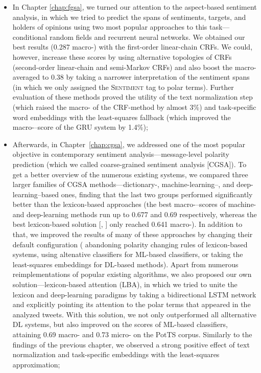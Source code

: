 \begin{itemize}
\item In Chapter \ref{chap:fgsa}, we turned our attention to the
  aspect-based sentiment analysis, in which we tried to predict the
  spans of sentiments, targets, and holders of opinions using two most
  popular approaches to this task---conditional random fields and
  recurrent neural networks.  We obtained our best results (0.287
  macro-\F{}) with the first-order linear-chain CRFs.  We could,
  however, increase these scores by using alternative topologies of
  CRFs (second-order linear-chain and semi-Markov CRFs) and also boost
  the macro-averaged \F{} to 0.38 by taking a narrower interpretation
  of the sentiment spans (in which we only assigned the
  \textsc{Sentiment} tag to polar terms).  Further evaluation of these
  methods proved the utility of the text normalization step (which
  raised the macro-\F{} of the CRF-method by almost 3\%) and
  task-specific word embeddings with the least-squares fallback (which
  improved the macro-\F{}--score of the GRU system by 1.4\%);

\item Afterwards, in Chapter~\ref{chap:cgsa}, we addressed one of the
  most popular objective in contemporary sentiment
  analysis---message-level polarity prediction (which we called
  coarse-grained sentiment analysis [CGSA]).  To get a better overview
  of the numerous existing systems, we compared three larger families
  of CGSA methods---dictionary-, machine-learning--, and
  deep-learning--based ones, finding that the last two groups
  performed significantly better than the lexicon-based approaches
  (the best macro-\F{}--scores of machine- and deep-learning methods
  run up to 0.677 and 0.69 respectively, whereas the best
  lexicon-based solution [\citeauthor{Hu:04}, \citeyear{Hu:04}] only
  reached 0.641 macro-\F{}).  In addition to that, we improved the
  results of many of these approaches by changing their default
  configuration (\eg{} abandoning polarity changing rules of
  lexicon-based systems, using altenative classifiers for ML-based
  classifiers, or taking the least-squares embeddings for DL-based
  methods).  Apart from numerous reimplementations of popular existing
  algorithms, we also proposed our own solution---lexicon-based
  attention (LBA), in which we tried to unite the lexicon and
  deep-learning paradigms by taking a bidirectional LSTM network and
  explicitly pointing its attention to the polar terms that appeared
  in the analyzed tweets.  With this solution, we not only
  outperformed all allternative DL systems, but also improved on the
  scores of ML-based classifiers, attaining 0.69 macro-\F{} and 0.73
  micro-\F{} on the PotTS corpus.  Similarly to the findings of the
  previous chapter, we observed a strong positive effect of text
  normalization and task-specific embeddings with the least-squares
  approximation;


\end{itemize}
